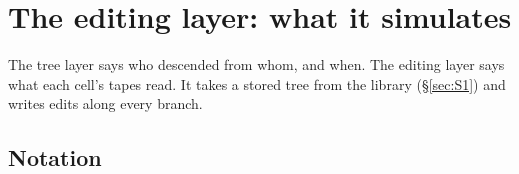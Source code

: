 
\section{The editing layer: what it simulates}\label{sec:edit}

The tree layer says who descended from whom, and when. The editing layer says what each cell's tapes
read. It takes a stored tree from the library (\S\ref{sec:S1}) and writes edits along every branch.

\subsection*{Notation}

